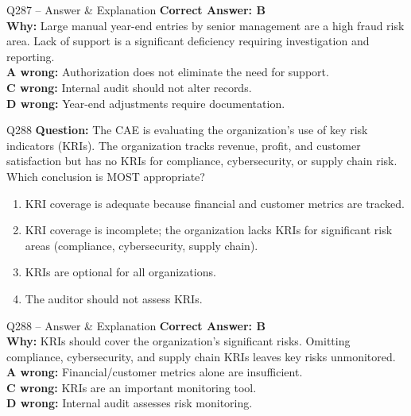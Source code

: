 \documentclass[aspectratio=169,10pt]{beamer}
\begin{document}
	\begin{frame}[t]{Q287 -- Answer \& Explanation}
		\small
		\textbf{Correct Answer: B} \\[4pt]
		\textbf{Why:} Large manual year-end entries by senior management are a high fraud risk area. Lack of support is a significant deficiency requiring investigation and reporting. \\[4pt]
		\textbf{A wrong:} Authorization does not eliminate the need for support. \\[2pt]
		\textbf{C wrong:} Internal audit should not alter records. \\[2pt]
		\textbf{D wrong:} Year-end adjustments require documentation.
	\end{frame}
	
	\begin{frame}[t]{Q288}
		\small
		\textbf{Question:} The CAE is evaluating the organization's use of key risk indicators (KRIs). The organization tracks revenue, profit, and customer satisfaction but has no KRIs for compliance, cybersecurity, or supply chain risk. Which conclusion is MOST appropriate?
		\begin{enumerate}[label=\Alph*.,itemsep=1pt,topsep=2pt]
			\item KRI coverage is adequate because financial and customer metrics are tracked.
			\item KRI coverage is incomplete; the organization lacks KRIs for significant risk areas (compliance, cybersecurity, supply chain).
			\item KRIs are optional for all organizations.
			\item The auditor should not assess KRIs.
		\end{enumerate}
	\end{frame}
	
	\begin{frame}[t]{Q288 -- Answer \& Explanation}
		\small
		\textbf{Correct Answer: B} \\[4pt]
		\textbf{Why:} KRIs should cover the organization's significant risks. Omitting compliance, cybersecurity, and supply chain KRIs leaves key risks unmonitored. \\[4pt]
		\textbf{A wrong:} Financial/customer metrics alone are insufficient. \\[2pt]
		\textbf{C wrong:} KRIs are an important monitoring tool. \\[2pt]
		\textbf{D wrong:} Internal audit assesses risk monitoring.
	\end{frame}
	
\end{document}

